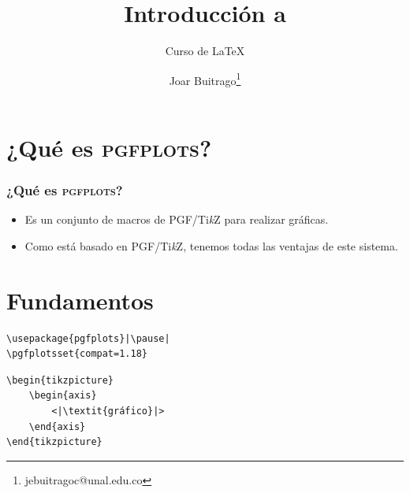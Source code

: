 \documentclass[12pt,aspectratio=169,ignorenonframetext]{ltxbeamer}
\title{Introducción a {\lmr\textmd{\PGFPlots}}}
\subtitle{Curso de {\lmr\LaTeX}}
\author{Joar Buitrago\texorpdfstring{\thanks{jebuitragoc@unal.edu.co}}{ <jebuitragoc@unal.edu.co>}}
\date{}
\newcommand{\TikZ}{Ti\textit{k}Z}
\newcommand{\PGFPlots}{\textsc{pgfplots}}
\begin{document}
\begin{frame}
\titlepage
\end{frame}





\section{¿Qué es {\lmr\PGFPlots}?}

\begin{frame}
\frametitle{¿Qué es {\lmr\PGFPlots}?}

\pause

\begin{itemize}[<+->]
    \item Es un conjunto de macros de {\lmr PGF/\TikZ} para realizar gráficas.
    \item Como está basado en {\lmr PGF/\TikZ}, tenemos todas las ventajas de este sistema.
\end{itemize}
\end{frame}





\section{Fundamentos}

\begin{frame}[fragile]
\begin{center}
    \fontsize{30}{36}\selectfont
    \begin{verbatim}
\usepackage{pgfplots}|\pause|
\pgfplotsset{compat=1.18}
    \end{verbatim}
\end{center}
\end{frame}





\begin{frame}[fragile]
\begin{verbatim}
\begin{tikzpicture}
    \begin{axis}
        <|\textit{gráfico}|>
    \end{axis}
\end{tikzpicture}
\end{verbatim}
\end{frame}
\end{document}
